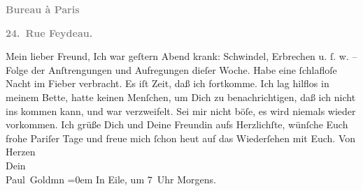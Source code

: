 \begin{ledgroupsized}[t]{13cm}
           \pstart
           \begin{otherlanguage}{french}\textcolor{gray}{\textbf{\textbf{Bureau à Paris}}}\end{otherlanguage}\pend
           \pstart
           \begin{otherlanguage}{french}\textcolor{gray}{\textbf{\textbf{24. Rue Feydeau.}}}\end{otherlanguage}\pend
           \pstart\center{}Mein lieber Freund,\pend\pstart
           Ich war geſtern{ }Abend krank: Schwindel, Erbrechen u. ſ. w. – Folge der Anſtrengungen und
               Aufregungen dieſer Woche. Habe eine ſchlafloſe Nacht im Fieber verbracht. Es iſt
               Zeit, daß ich fortkomme. Ich lag hilflos in meinem Bette, hatte keinen Menſchen, um
               Dich zu benachrichtigen, daß ich nicht ins \label{K_L02808-11v}\label{K_L02808-11h} kommen kann, und
               war verzweifelt. Sei mir nicht böſe, es wird niemals wieder vorkommen.\pend
           \pstart
           Ich grüße Dich und Deine {\pb}Freundin aufs Herzlichſte,
               wünſche Euch frohe Pariſer Tage und freue mich
               ſchon heut auf das Wiederſehen mit Euch.\pend
           \pstart
           Von Herzen {\\[\baselineskip]}Dein {\\[\baselineskip]}\spacefill\mbox{Paul Goldmn}\pend
           \leftskip=0em{}\pstart
           \noindent{}In Eile, um 7 Uhr Morgens.\pend
           
         
         \endnumbering{}\end{ledgroupsized}  \newcommand{\dateiname}{L02808}\newcommand{\titel}{Paul Goldmann an Arthur Schnitzler, 17. 4. [1897]}\newcommand{\editorInnen}{Martin Anton Müller und Laura Untner}
      
